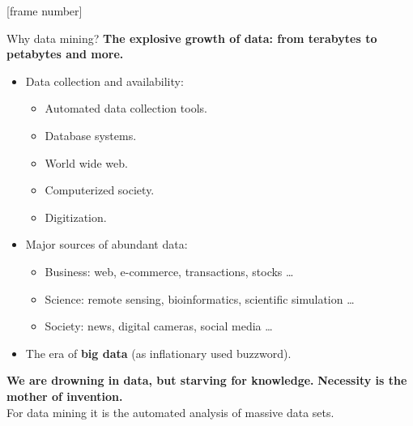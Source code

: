 \documentclass[aspectratio=169,t]{beamer}
\begin{document}
  {
    [frame number]
    \begin{frame}{Why data mining?}
    \textbf{The explosive growth of data: from terabytes to petabytes and more.}\\
        \begin{itemize}
            \item Data collection and availability:
                \begin{itemize}
                    \item Automated data collection tools.
                    \item Database systems.
                    \item World wide web.
                    \item Computerized society.
                    \item Digitization.
                \end{itemize}
            \item Major sources of abundant data:
                \begin{itemize}
                    \item Business: web, e-commerce, transactions, stocks \ldots
                    \item Science: remote sensing, bioinformatics, scientific simulation \ldots
                    \item Society: news, digital cameras, social media \ldots
                \end{itemize}
            \item The era of \textbf{big data} (as inflationary used buzzword).
        \end{itemize}
    \textbf{We are drowning in data, but starving for knowledge.} \textbf{Necessity is the mother of invention.}\\
    For data mining it is the automated analysis of massive data sets.
    \end{frame}
  }
\end{document}
